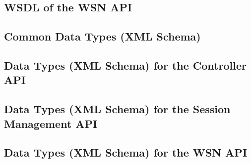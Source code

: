 \documentclass[a4paper,12pt]{article}
\begin{document}
			\subsection{WSDL of the WSN API}
	

			\subsection{Common Data Types (XML Schema)}
	

			\subsection{Data Types (XML Schema) for the Controller API}
	

			\subsection{Data Types (XML Schema) for the Session Management API}
	

			\subsection{Data Types (XML Schema) for the WSN API}
	

	\sectionfin
	
	

	\label{lastpage}
		
\end{document}
